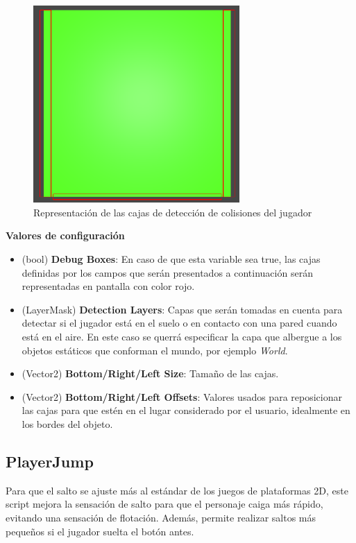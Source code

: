 \begin{figure}[t]
	\centering
	\includegraphics[width = 0.7\textwidth]{Imagenes/CollDetector.png}
	\caption{Representación de las cajas de detección de colisiones del jugador}
	\label{fig:Player_Coll_Detector}
\end{figure}

\textbf{Valores de configuración}
\begin{itemize}
	\item (bool) \textbf{ Debug Boxes}: En caso de que esta variable sea true, las cajas definidas por los campos que serán presentados a continuación serán representadas en pantalla con color rojo.
	\item (LayerMask)  \textbf{Detection Layers}: Capas que serán tomadas en cuenta para detectar si el jugador está en el suelo o en contacto con una pared cuando está en el aire. En este caso se querrá especificar la capa que albergue a los objetos estáticos que conforman el mundo, por ejemplo \textit{World}.
	\item (Vector2) \textbf{Bottom/Right/Left Size}: Tamaño de las cajas.
	\item (Vector2) \textbf{Bottom/Right/Left Offsets}: Valores usados para reposicionar las cajas para que estén en el lugar considerado por el usuario, idealmente en los bordes del objeto.
\end{itemize}

\subsection{PlayerJump}

Para que el salto se ajuste más al estándar de los juegos de plataformas 2D, este script mejora la sensación de salto para que el personaje caiga más rápido, evitando una sensación de flotación. Además, permite realizar saltos más pequeños si el jugador suelta el botón antes.\\

